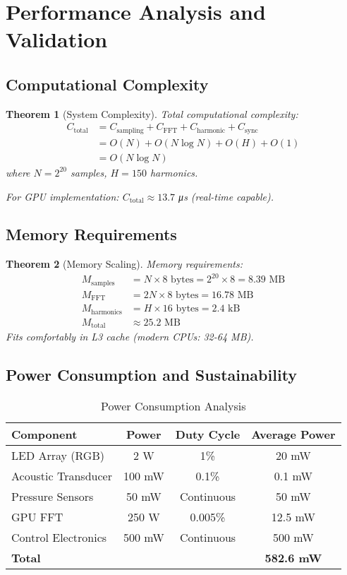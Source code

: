 \documentclass[12pt,a4paper]{article}
\newtheorem{theorem}{Theorem}[section]
\begin{document}
\section{Performance Analysis and Validation}

\subsection{Computational Complexity}

\begin{theorem}[System Complexity]
Total computational complexity:
\begin{align}
C_{\text{total}} &= C_{\text{sampling}} + C_{\text{FFT}} + C_{\text{harmonic}} + C_{\text{sync}} \\
&= O(N) + O(N \log N) + O(H) + O(1) \\
&= O(N \log N)
\end{align}
where $N = 2^{20}$ samples, $H = 150$ harmonics.

For GPU implementation: $C_{\text{total}} \approx 13.7$ μs (real-time capable).
\end{theorem}

\subsection{Memory Requirements}

\begin{theorem}[Memory Scaling]
Memory requirements:
\begin{align}
M_{\text{samples}} &= N \times 8 \text{ bytes} = 2^{20} \times 8 = 8.39 \text{ MB} \\
M_{\text{FFT}} &= 2N \times 8 \text{ bytes} = 16.78 \text{ MB} \\
M_{\text{harmonics}} &= H \times 16 \text{ bytes} = 2.4 \text{ kB} \\
M_{\text{total}} &\approx 25.2 \text{ MB}
\end{align}
Fits comfortably in L3 cache (modern CPUs: 32-64 MB).
\end{theorem}

\subsection{Power Consumption and Sustainability}

\begin{table}[H]
\centering
\caption{Power Consumption Analysis}
\begin{tabular}{lccc}
\toprule
Component & Power & Duty Cycle & Average Power \\
\midrule
LED Array (RGB) & 2 W & 1\% & 20 mW \\
Acoustic Transducer & 100 mW & 0.1\% & 0.1 mW \\
Pressure Sensors & 50 mW & Continuous & 50 mW \\
GPU FFT & 250 W & 0.005\% & 12.5 mW \\
Control Electronics & 500 mW & Continuous & 500 mW \\
\midrule
\textbf{Total} & & & \textbf{582.6 mW} \\
\bottomrule
\end{tabular}
\end{table}
\end{document}
